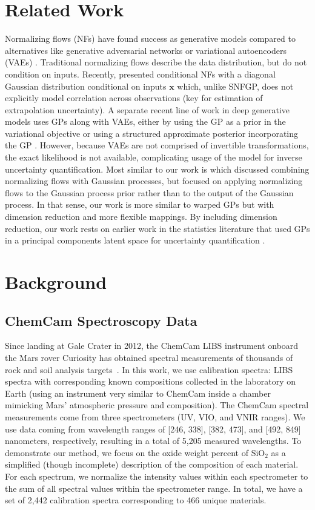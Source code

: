 \documentclass[letterpaper]{article} %
\begin{document}
\section{Related Work}
Normalizing flows (NFs) have found success as generative models compared to alternatives like generative adversarial networks or variational autoencoders (VAEs) \cite{rezende2015variational, papamakarios2019normalizing}.
Traditional normalizing flows describe the data distribution, but do not condition on inputs.
Recently, \cite{winkler2019learning} presented conditional NFs with a diagonal Gaussian distribution conditional on inputs $\mathbf{x}$ which, unlike SNFGP, does not explicitly model correlation across observations (key for estimation of extrapolation uncertainty).
A separate recent line of work in deep generative models uses GPs along with VAEs, either by using the GP as a prior in the variational objective or using a structured approximate posterior incorporating the GP \cite{casale2018gaussian,pearce2020gaussian}.
However, because VAEs are not comprised of invertible transformations, the exact likelihood is not available, complicating usage of the model for inverse uncertainty quantification.
Most similar to our work is \cite{maronas2021transforming} which discussed combining normalizing flows with Gaussian processes, but focused on applying normalizing flows to the Gaussian process prior rather than to the output of the Gaussian process. 
In that sense, our work is more similar to warped GPs \cite{snelson2004warped} but with dimension reduction and more flexible mappings.
By including dimension reduction, our work rests on earlier work in the statistics literature that used GPs in a principal components latent space for uncertainty quantification \cite{higdon2008computer}.

\section{Background}
\subsection{ChemCam Spectroscopy Data}
Since landing at Gale Crater in 2012, the ChemCam LIBS instrument onboard the Mars rover Curiosity has obtained spectral measurements of thousands of rock and soil analysis targets~\cite{maurice2016chemcam}. 
In this work, we use calibration spectra: LIBS spectra with corresponding known compositions collected in the laboratory on Earth (using an instrument very similar to ChemCam inside a chamber mimicking Mars' atmospheric pressure and composition).
The ChemCam spectral measurements come from three spectrometers (UV, VIO, and VNIR ranges). 
We use data coming from wavelength ranges of [246, 338], [382, 473], and [492, 849] nanometers, respectively, resulting in a total of 5,205 measured wavelengths.
To demonstrate our method, we focus on the oxide weight percent of SiO$_2$ as a simplified (though incomplete) description of the composition of each material.
For each spectrum, we normalize the intensity values within each spectrometer to the sum of all spectral values within the spectrometer range.
In total, we have a set of 2,442 calibration spectra corresponding to 466 unique materials. 
\end{document}
